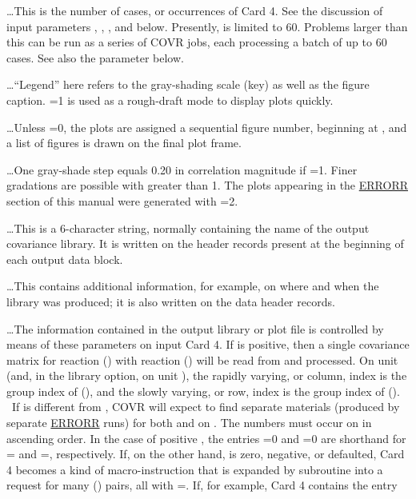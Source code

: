  \ldots\hspace{.1in}This is the number of cases, or
occurrences of Card 4.  See the discussion of input parameters
, , , and  below.
Presently,  is limited to 60.  Problems larger than this
can be run as a series of COVR jobs, each processing a batch of up to
60 cases.  See also the parameter  below.

 \ldots\hspace{.1in}``Legend'' here refers to the
gray-shading scale (key) as well as the figure caption.
=1 is used as a rough-draft mode to display plots
quickly.

 \ldots\hspace{.1in}Unless =0, the plots
are assigned a sequential figure number, beginning at ,
and a list of figures is drawn on the final plot frame.

 \ldots\hspace{.1in}One gray-shade step equals 0.20 in
correlation magnitude if =1.  Finer gradations are possible
with  greater than 1.  The plots appearing in the
\hyperlink{sERRORRhy}{ERRORR} section of this manual were
generated with =2.

 \ldots\hspace{.1in}This is a 6-character string,
normally containing the name of the output covariance library.  It
is written on the header records present at the beginning of each
output data block.

 \ldots\hspace{.1in}This contains additional
information, for example, on where and when the library was produced;
it is also written on the data header records.

 \ldots\hspace{.1in}The information
contained in the output library or plot file is controlled by means of
these parameters on input Card 4.  If  is
positive, then a single covariance matrix for reaction
() with reaction () will be read from
 and processed.  On unit  (and, in the library
option, on unit ), the rapidly varying, or column,
index is the group index of (), and the slowly varying,
or row, index is the group index of (). ~If
 is different from , COVR will expect to find
separate materials (produced by separate
\hyperlink{sERRORRhy}{ERRORR} runs) for both
 and  on .  The  numbers
must occur on  in ascending order.  In the case of positive
, the entries =0 and =0 are shorthand
for = and =, respectively.
If, on the other hand,  is zero, negative, or
defaulted, Card 4 becomes a kind of macro-instruction that
is expanded by subroutine  into a request for many
() pairs, all  with =.  If, for example,
Card 4 contains the entry

